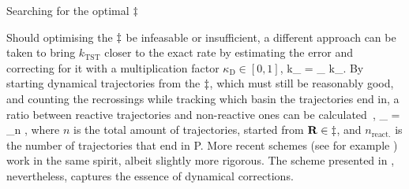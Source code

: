 Searching for the optimal $\ddagger$ \expand

Should optimising the $\ddagger$ be infeasable or insufficient, a different approach can be taken to bring $k_\text{TST}$ closer to the exact rate by estimating the error and correcting for it with a multiplication factor $\kappa_\text{D} \in [0, 1]$,
k_ = \kappa_ \text{ } k_.
\eeq
By starting dynamical trajectories from the $\ddagger$, which must still be reasonably good, and counting the recrossings while tracking which basin the trajectories end in, a ratio between reactive trajectories and non-reactive ones can be calculated~\cite{dynamical-corrections-keck-1962},
\kappa_ = \lim_{n \rightarrow \infty} ,
\eeq
where $n$ is the total amount of trajectories, started from ${\mathrm{\mathbf{\bm{R}}}} \in \ddagger$, and $n_\text{react.}$ is the number of trajectories that end in P.
More recent schemes (see for example \cite{vtst-2005, dynamical-corrections-chandler-1977, dynamical-corrections-bennett-1977}) work in the same spirit, albeit slightly more rigorous.
The scheme presented in , nevertheless, captures the essence of dynamical corrections.
